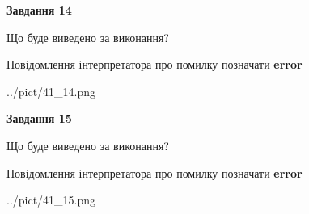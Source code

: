 \documentclass[11pt, ukrainian]{article}
\begin{document}
{\begin {large}
{\begin {center}\textbf{Завдання 14}\end {center}}\par
Що буде виведено за виконання? \par
Повідомлення інтерпретатора про помилку позначати \textbf{error}

\begin{center}
	{../pict/41_14.png}
\end{center}
\newpage

{\begin {center}\textbf{Завдання 15}\end {center}}\par
Що буде виведено за виконання? \par
Повідомлення інтерпретатора про помилку позначати \textbf{error}

\begin{center}
	{../pict/41_15.png}
\end{center}
\newpage

\end {large}}
\end{document}
